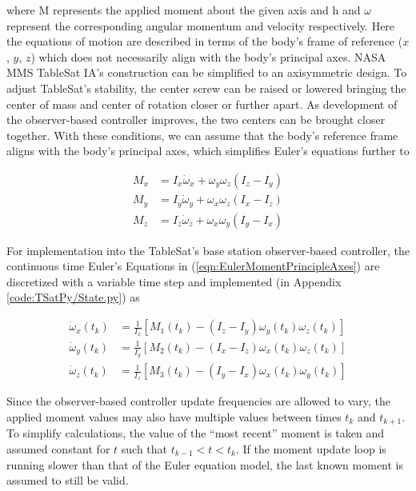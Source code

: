 where M represents the applied moment about the given axis and h and $\omega$ represent the corresponding angular momentum and velocity respectively.  Here the equations of motion are described in terms of the body's frame of reference ($x$, $y$, $z$) which does not necessarily align with the body's principal axes.  NASA MMS TableSat IA's construction can be simplified to an axisymmetric design.  To adjust TableSat's stability, the center screw can be raised or lowered bringing the center of mass and center of rotation closer or further apart.  As development of the observer-based controller improves, the two centers can be brought closer together.  With these conditions, we can assume that the body's reference frame aligns with the body's principal axes, which simplifies Euler's equations further to

\begin{subequations}
  \begin{align}
    M_x & = I_x \dot{\omega}_x + \omega_y \omega_z (I_z - I_y) \\
    M_y & = I_y \dot{\omega}_y + \omega_x \omega_z (I_x - I_z) \\
    M_z & = I_z \dot{\omega}_z + \omega_x \omega_y (I_y - I_x)
  \end{align}
  \label{eqn:EulerMomentPrincipleAxes}
\end{subequations}

For implementation into the TableSat's base station observer-based controller, the continuous time Euler's Equations in (\ref{eqn:EulerMomentPrincipleAxes}) are discretized with a variable time step and implemented (in Appendix \ref{code:TSatPy/State.py}) as

\begin{subequations}
  \begin{align}
    \dot{\omega}_{x}(t_{k}) & = \frac{1}{I_x} \left[ M_1(t_{k}) - (I_z - I_y) \omega_{y}(t_k) \omega_{z}(t_k) \right] \\
    \dot{\omega}_{y}(t_{k}) & = \frac{1}{I_y} \left[ M_2(t_{k}) - (I_x - I_z) \omega_{x}(t_k) \omega_{z}(t_k) \right] \\
    \dot{\omega}_{z}(t_{k}) & = \frac{1}{I_z} \left[ M_3(t_{k}) - (I_y - I_x) \omega_{x}(t_k) \omega_{y}(t_k) \right]
  \end{align}
  \label{eqn:DiscreteEulerMomentEquations}
\end{subequations}

Since the observer-based controller update frequencies are allowed to vary, the applied moment values may also have multiple values between times $t_{k}$ and $t_{k+1}$.  To simplify calculations, the value of the ``most recent'' moment is taken and assumed constant for $t$ such that $t_{k-1} < t < t_{k}$.  If the moment update loop is running slower than that of the Euler equation model, the last known moment is assumed to still be valid.


